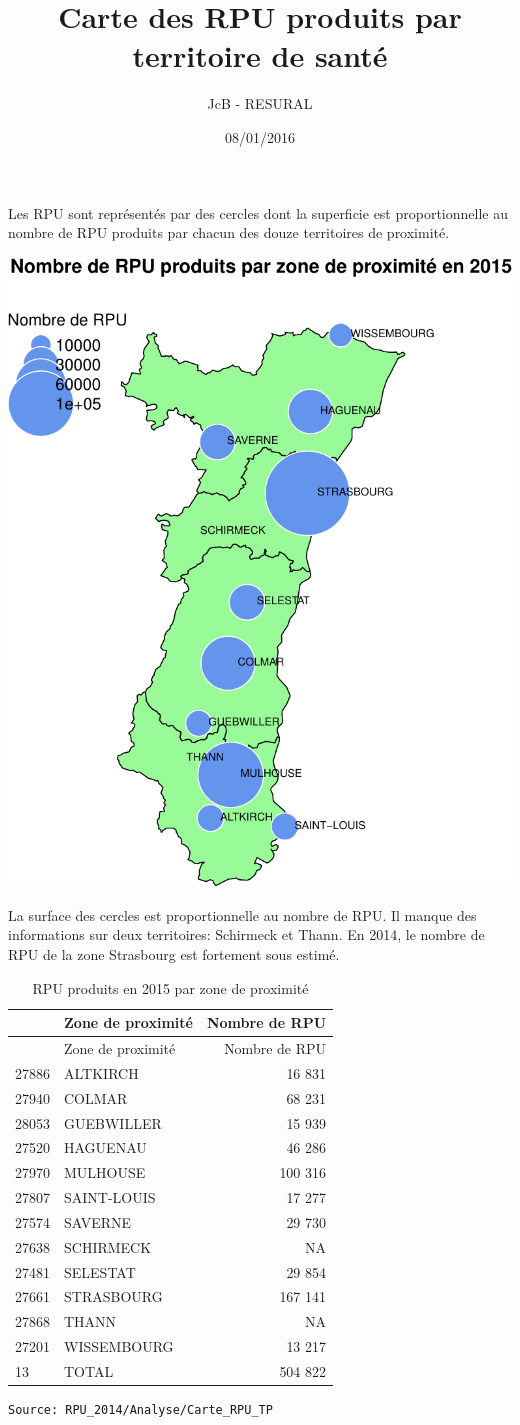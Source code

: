 \documentclass[]{article}
\title{Carte des RPU produits par territoire de santé}
\author{JcB - RESURAL}
\date{08/01/2016}
\begin{document}
\maketitle


Les RPU sont représentés par des cercles dont la superficie est
proportionnelle au nombre de RPU produits par chacun des douze
territoires de proximité.

\includegraphics{carte_rpu_tp_prod_files/figure-latex/carte_prod-1.pdf}

La surface des cercles est proportionnelle au nombre de RPU. Il manque
des informations sur deux territoires: Schirmeck et Thann. En 2014, le
nombre de RPU de la zone Strasbourg est fortement sous estimé.

\begin{longtable}[c]{@{}llr@{}}
\caption{RPU produits en 2015 par zone de proximité}\tabularnewline
\toprule
& Zone de proximité & Nombre de RPU\tabularnewline
\midrule
\endfirsthead
\toprule
& Zone de proximité & Nombre de RPU\tabularnewline
\midrule
\endhead
27886 & ALTKIRCH & 16 831\tabularnewline
27940 & COLMAR & 68 231\tabularnewline
28053 & GUEBWILLER & 15 939\tabularnewline
27520 & HAGUENAU & 46 286\tabularnewline
27970 & MULHOUSE & 100 316\tabularnewline
27807 & SAINT-LOUIS & 17 277\tabularnewline
27574 & SAVERNE & 29 730\tabularnewline
27638 & SCHIRMECK & NA\tabularnewline
27481 & SELESTAT & 29 854\tabularnewline
27661 & STRASBOURG & 167 141\tabularnewline
27868 & THANN & NA\tabularnewline
27201 & WISSEMBOURG & 13 217\tabularnewline
13 & TOTAL & 504 822\tabularnewline
\bottomrule
\end{longtable}

\begin{verbatim}
Source: RPU_2014/Analyse/Carte_RPU_TP
\end{verbatim}
\end{document}

